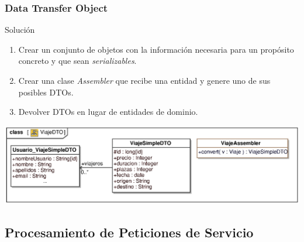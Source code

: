 \documentclass[a4paper,slidestop,xcolor=pst,blue]{beamer}
\begin{document}
\begin{frame}[c]
    \frametitle{Data Transfer Object}
    \begin{block}{Solución}
        \begin{enumerate}[<+->]
            \item Crear un conjunto de objetos con la información necesaria para un propósito concreto y que sean \emph{serializables}.
            \item Crear una clase \emph{Assembler} que recibe una entidad y genere uno de sus posibles DTOs.
            \item Devolver DTOs en lugar de entidades de dominio.
        \end{enumerate}
    \end{block}
    \begin{center}
        \includegraphics[width=\linewidth]{images/patterns/dto01.eps}
    \end{center}
\end{frame}

\subsection{Procesamiento de Peticiones de Servicio}
\end{document}
